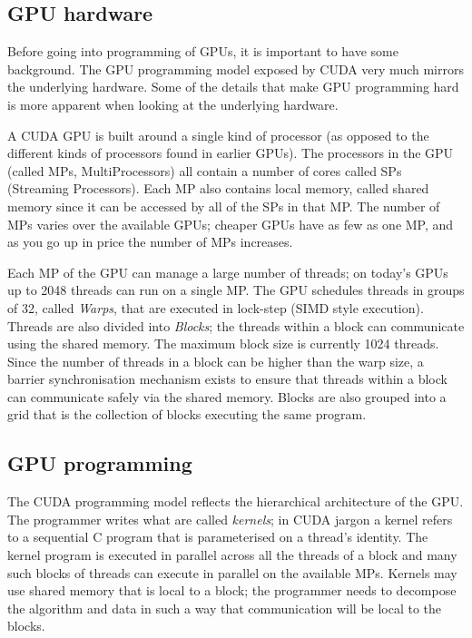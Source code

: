 \documentclass[a4paper]{book}
\begin{document}

\subsection{GPU hardware} 

Before going into programming of GPUs, it is important to have some background. The 
GPU programming model exposed by CUDA very much mirrors the underlying hardware. Some 
of the details that make GPU programming hard is more apparent when looking at the 
underlying hardware. 

A CUDA GPU is built around a single kind of processor (as opposed to the different 
kinds of processors found in earlier GPUs). The processors in the GPU (called MPs, 
MultiProcessors) all contain a number of cores called SPs (Streaming Processors). 
Each MP also contains local memory, called shared memory since it can be accessed 
by all of the SPs in that MP. The number of MPs varies over the available GPUs; cheaper 
GPUs have as few as one MP, and as you go up in price the number of MPs increases.

Each MP of the GPU can manage a large number of threads; on today's GPUs up to 
2048 threads can run on a single MP. The GPU schedules threads in groups of 32, called 
{\em Warps}, that are executed in lock-step (SIMD style execution). Threads are 
also divided into {\em Blocks}; the threads within a block can communicate using the 
shared memory. The maximum block size is currently 1024 threads. Since 
the number of threads in a block can be higher than the warp size, a barrier 
synchronisation mechanism exists to ensure that threads within a block 
can communicate safely via the shared memory. Blocks are also grouped into a grid that 
is the collection of blocks executing the same program. 


\subsection{GPU programming} 
\label{GPUPROGRAMMING}

The CUDA programming model reflects the hierarchical architecture of the GPU. The 
programmer writes what are called \emph{kernels}; in CUDA jargon a kernel refers to a sequential 
C program that is parameterised on a thread's identity. The kernel program is executed 
in parallel across all the threads of a block and many such blocks of threads can execute 
in parallel on the available MPs. Kernels may use shared memory that is local to a block; 
the programmer needs to decompose the algorithm and data in such a way that communication 
will be local to the blocks. 
\end{document}
